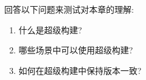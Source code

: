 回答以下问题来测试对本章的理解:

\begin{enumerate}
\item 
什么是超级构建?

\item 
哪些场景中可以使用超级构建?

\item 
如何在超级构建中保持版本一致?
\end{enumerate}